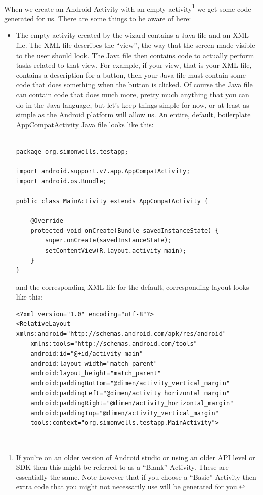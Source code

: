 \paragraph{} When we create an Android Activity with an empty activity\footnote{If you're on an older version of Android studio or using an older API level or SDK then this might be referred to as a ``Blank'' Activity. These are essentially the same. Note however that if you choose a ``Basic'' Activity then extra code that you might not necessarily use will be generated for you.} we get some code generated for us. There are some things to be aware of here:

\begin{itemize}
\item The empty activity created by the wizard contains a Java file and an XML file. The XML file describes the ``view'', the way that the screen made visible to the user should look. The Java file then contains code to actually perform tasks related to that view. For example, if your view, that is your XML file, contains a description for a  button, then your Java file must contain some code that does something when the button is clicked. Of course the Java file can contain code that does much more, pretty much anything that you can do in the Java language, but let's keep things simple for now, or at least as simple as the Android platform will allow us. An entire, default, boilerplate AppCompatActivity Java file looks like this:

\begin{lstlisting}

package org.simonwells.testapp;

import android.support.v7.app.AppCompatActivity;
import android.os.Bundle;

public class MainActivity extends AppCompatActivity {

    @Override
    protected void onCreate(Bundle savedInstanceState) {
        super.onCreate(savedInstanceState);
        setContentView(R.layout.activity_main);
    }
}
\end{lstlisting}

and the corresponding XML file for the default, corresponding layout looks like this:

\begin{lstlisting}
<?xml version="1.0" encoding="utf-8"?>
<RelativeLayout xmlns:android="http://schemas.android.com/apk/res/android"
    xmlns:tools="http://schemas.android.com/tools"
    android:id="@+id/activity_main"
    android:layout_width="match_parent"
    android:layout_height="match_parent"
    android:paddingBottom="@dimen/activity_vertical_margin"
    android:paddingLeft="@dimen/activity_horizontal_margin"
    android:paddingRight="@dimen/activity_horizontal_margin"
    android:paddingTop="@dimen/activity_vertical_margin"
    tools:context="org.simonwells.testapp.MainActivity">


\end{lstlisting}
\end{itemize}
